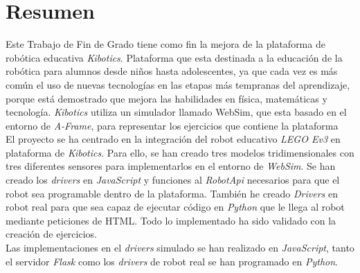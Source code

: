 \chapter*{Resumen}

     Este Trabajo de Fin de Grado tiene como fin la mejora de la plataforma de robótica educativa \textit{Kibotics}. Plataforma que esta destinada a la educación de la robótica para alumnos desde niños hasta adolescentes, ya que cada vez es más común el uso de nuevas tecnologías en las etapas más tempranas del aprendizaje, porque está demostrado que mejora las habilidades en física, matemáticas y tecnología. \textit{Kibotics} utiliza un simulador llamado WebSim, que esta basado en el entorno de \textit{A-Frame}, para representar los ejercicios que contiene la plataforma\\
    
    
    El proyecto se ha centrado en la integración del robot educativo \textit{LEGO Ev3} en plataforma de \textit{Kibotics}. Para ello, se han creado tres modelos tridimensionales con tres diferentes sensores para implementarlos en el entorno de \textit{WebSim}. Se han creado los \textit{drivers} en \textit{JavaScript} y funciones al \textit{RobotApi} necesarios para que el robot sea programable dentro de la plataforma. También he creado \textit{Drivers} en robot real para que sea capaz de ejecutar código en \textit{Python} que le llega al robot mediante peticiones de HTML. Todo lo implementado ha sido validado con la creación de ejercicios.  \\
    
    
    Las implementaciones en el \textit{drivers} simulado se han realizado en \textit{JavaScript}, tanto el servidor \textit{Flask} como los \textit{drivers} de robot real se han programado en \textit{Python}.  